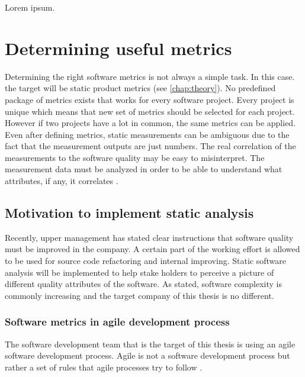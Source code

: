 Lorem ipsum.



\chapter{Determining useful metrics}

Determining the right software metrics is not always a simple task. In this case. the target will be static product metrics (see \autoref{chap:theory}). No predefined package of metrics exists that works for every software project. Every project is unique which means that new set of metrics should be selected for each project. However if two projects have a lot in common, the same metrics can be applied. Even after defining metrics, static measurements can be ambiguous due to the fact that the measurement outputs are just numbers. The real correlation of the measurements to the software quality may be easy to misinterpret. The measurement data must be analyzed in order to be able to understand what attributes, if any, it correlates \cite{sommerville2011software}. 

\section{Motivation to implement static analysis}

Recently, upper management has stated clear instructions that software quality must be improved in the company. A certain part of the working effort is allowed to be used for source code refactoring and internal improving. Static software analysis will be implemented to help stake holders to perceive a picture of different quality attributes of the software. As stated, software complexity is commonly increasing and the target company of this thesis is no different. 

\subsection{Software metrics in agile development process}

The software development team that is the target of this thesis is using an agile software development process. Agile is not a software development process but rather a set of rules that agile processes try to follow \cite{agilemanifesto}.

